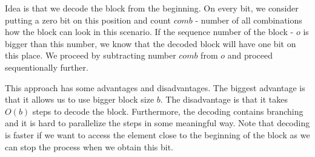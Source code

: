 Idea is that we decode the block from the beginning. On every bit, we consider putting a
zero bit on this position and count $comb$ - number of all combinations how the block can
look in this scenario. If the sequence number of the block - $o$ is bigger than this number,
we know that the decoded block will have one bit on this place. We proceed by subtracting
number $comb$ from $o$ and proceed sequentionally further.

This approach has some advantages and disadvantages. The biggest advantage is that it allows
us to use bigger block size $b$. The disadvantage is that it takes $O(b)$ steps to decode the
block. Furthermore, the decoding contains branching and it is hard to parallelize the steps
in some meaningful way. Note that decoding is faster if we want to access the element
close to the beginning of the block as we can stop the process when we obtain this bit.